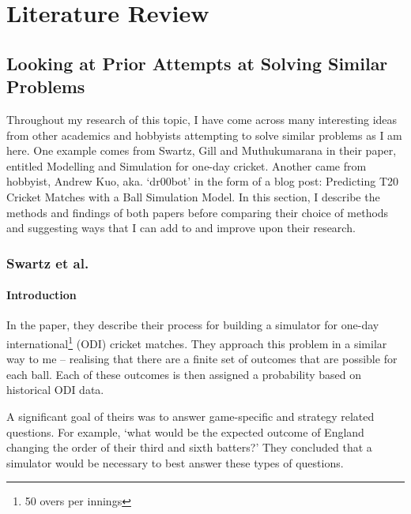 \titleformat{\chapter}[hang]{\Huge\bfseries}{\thechapter\hsp\textcolor{gray75}{|}\hsp}{0pt}{\Huge\bfseries}
\chapter{Literature Review}
\label{chap: Lit}

\section{Looking at Prior Attempts at Solving Similar Problems}

Throughout my research of this topic, I have come across many interesting ideas from other academics and hobbyists attempting to solve similar problems as I am here. One example comes from Swartz, Gill and Muthukumarana \cite{swartz_modelling_2009} in their paper, entitled Modelling and Simulation for one-day cricket. Another came from hobbyist, Andrew Kuo, aka. ‘dr00bot’ \cite{kuo_predicting_2021} in the form of a blog post: Predicting T20 Cricket Matches with a Ball Simulation Model. In this section, I describe the methods and findings of both papers before comparing their choice of methods and suggesting ways that I can add to and improve upon their research.

\subsection{Swartz et al.}

\subsubsection{Introduction}

In the paper, they describe their process for building a simulator for one-day international\footnote{50 overs per innings} (ODI) cricket matches. They approach this problem in a similar way to me – realising that there are a finite set of outcomes that are possible for each ball. Each of these outcomes is then assigned a probability based on historical ODI data.

A significant goal of theirs was to answer game-specific and strategy related questions. For example, ‘what would be the expected outcome of England changing the order of their third and sixth batters?’ They concluded that a simulator would be necessary to best answer these types of questions.

